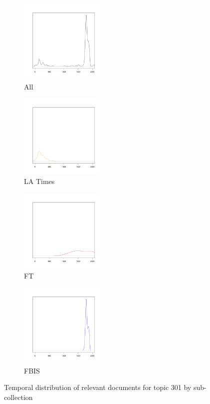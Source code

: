 \documentclass{asist}
\begin{document}
\begin{figure}
\begin{subfigure}[t]{4cm}
\includegraphics[width=4cm]{analysis/301/301-trec8.pdf}
\caption{All}
\end{subfigure}
\begin{subfigure}[t]{4cm}
\includegraphics[width=4cm]{analysis/301/301-la.pdf}
\caption{LA Times}
\end{subfigure}
\begin{subfigure}[t]{4cm}
\includegraphics[width=4cm]{analysis/301/301-ft.pdf}
\caption{FT}
\end{subfigure}
\begin{subfigure}[t]{4cm}
\includegraphics[width=4cm]{analysis/301/301-fbis.pdf}
\caption{FBIS}
\end{subfigure}
\caption{Temporal distribution of relevant documents for topic 301 by sub-collection} 
\label{fig.301}
\end{figure}
\end{document}
